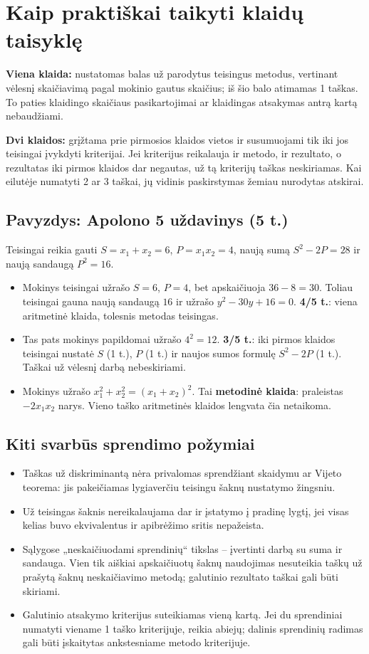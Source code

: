 \documentclass[11pt,a4paper]{article}
\begin{document}
\newpage
\section*{Kaip praktiškai taikyti klaidų taisyklę}
\textbf{Viena klaida:} nustatomas balas už parodytus teisingus metodus, vertinant vėlesnį skaičiavimą pagal mokinio gautus skaičius; iš šio balo atimamas 1 taškas. To paties klaidingo skaičiaus pasikartojimai ar klaidingas atsakymas antrą kartą nebaudžiami.

\textbf{Dvi klaidos:} grįžtama prie pirmosios klaidos vietos ir susumuojami tik iki jos teisingai įvykdyti kriterijai. Jei kriterijus reikalauja ir metodo, ir rezultato, o rezultatas iki pirmos klaidos dar negautas, už tą kriterijų taškas neskiriamas. Kai eilutėje numatyti 2 ar 3 taškai, jų vidinis paskirstymas žemiau nurodytas atskirai.

\subsection*{Pavyzdys: Apolono 5 uždavinys (5 t.)}
Teisingai reikia gauti $S=x_1+x_2=6$, $P=x_1x_2=4$, naują sumą $S^2-2P=28$ ir naują sandaugą $P^2=16$.
\begin{itemize}
\item Mokinys teisingai užrašo $S=6$, $P=4$, bet apskaičiuoja $36-8=30$. Toliau teisingai gauna naują sandaugą $16$ ir užrašo $y^2-30y+16=0$. \textbf{4/5 t.}: viena aritmetinė klaida, tolesnis metodas teisingas.
\item Tas pats mokinys papildomai užrašo $4^2=12$. \textbf{3/5 t.}: iki pirmos klaidos teisingai nustatė $S$ (1 t.), $P$ (1 t.) ir naujos sumos formulę $S^2-2P$ (1 t.). Taškai už vėlesnį darbą nebeskiriami.
\item Mokinys užrašo $x_1^2+x_2^2=(x_1+x_2)^2$. Tai \textbf{metodinė klaida}: praleistas $-2x_1x_2$ narys. Vieno taško aritmetinės klaidos lengvata čia netaikoma.
\end{itemize}

\subsection*{Kiti svarbūs sprendimo požymiai}
\begin{itemize}
\item Taškas už diskriminantą nėra privalomas sprendžiant skaidymu ar Vijeto teorema: jis pakeičiamas lygiaverčiu teisingu šaknų nustatymo žingsniu.
\item Už teisingas šaknis nereikalaujama dar ir įstatymo į pradinę lygtį, jei visas kelias buvo ekvivalentus ir apibrėžimo sritis nepažeista.
\item Sąlygose „neskaičiuodami sprendinių“ tikslas -- įvertinti darbą su suma ir sandauga. Vien tik aiškiai apskaičiuotų šaknų naudojimas nesuteikia taškų už prašytą šaknų neskaičiavimo metodą; galutinio rezultato taškai gali būti skiriami.
\item Galutinio atsakymo kriterijus suteikiamas vieną kartą. Jei du sprendiniai numatyti viename 1 taško kriterijuje, reikia abiejų; dalinis sprendinių radimas gali būti įskaitytas ankstesniame metodo kriterijuje.
\end{itemize}
\end{document}
